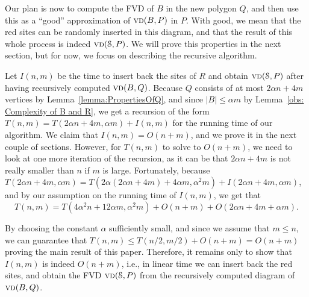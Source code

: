 \documentclass[a4paper,UKenglish]{socg-lipics-v2018}
\newcommand{\s}{\mathcal S}
\newcommand{\vd}[2][P]{\textsc{vd}(#2, #1)}
\newcommand{\bvd}[2][P]{\textsc{vd}_{\partial}(#2, #1)}
\newcommand{\LL}[1][\s, P]{\ensuremath{\mathcal L_{_{#1}}}}
\newcommand{\A}{\ensuremath{\mathcal A}}
\begin{document}
Our plan is now to compute the FVD of $B$ in the new polygon $Q$, and then use this as a ``good'' approximation of $\vd{B}$ in $P$. 
With good, we mean that the red sites can be randomly inserted in this diagram, and that the result of this whole process is indeed $\vd{\s}$. 
We will prove this properties in the next section, but for now, we focus on describing the recursive algorithm.

Let $I(n,m)$ be the time to insert back the sites of $R$ and obtain $\vd{\s}$ after having recursively computed $\vd[Q]{B}$.
Because $Q$ consists of at most $2\alpha n + 4m$ vertices by Lemma~\ref{lemma:PropertiesOfQ}, and since $|B|\leq \alpha m$ by Lemma~\ref{obs: Complexity of B and R}, we get a recursion of the form $T(n, m) = T(2\alpha n + 4m, \alpha m) + I(n,m)$ for the running time of our algorithm. 
We claim that $I(n,m) = O(n+m)$, and we prove it in the next couple of sections.
However, for $T(n,m)$ to solve to $O(n+ m)$, we need to look at one more iteration of the recursion, as it can be that $2\alpha n + 4m$ is not really smaller than $n$ if $m$ is large. 
Fortunately, because $T(2\alpha n + 4m, \alpha m) = T(2\alpha(2\alpha n + 4m) + 4\alpha m, \alpha^2 m) + I(2 \alpha n + 4m, \alpha m)$, and by our assumption on the running time of $I(n,m)$, we get that
\[T(n,m) = T(4\alpha^2 n + 12\alpha m, \alpha^2 m) + O(n+m) + O(2\alpha n + 4m + \alpha m).\]

By choosing the constant $\alpha$ sufficiently small, and since we assume that $m\leq n$, we can guarantee that $T(n, m) \leq T(n/2, m/2) + O(n + m) = O(n +m)$ proving the main result of this paper.
Therefore, it remains only to show that $I(n,m)$ is indeed $O(n+ m)$, i.e., in linear time we can insert back the red sites, and obtain the FVD $\vd{\s}$ from the recursively computed diagram of $\vd[Q]{B}$.
\end{document}
